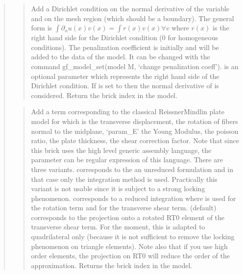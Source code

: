 \documentclass[a4paper,11pt,english]{sphinxmanual}
\begin{document}
\begin{quote}
\begin{quote}
\sphinxAtStartPar
Add a Dirichlet condition on the normal derivative of the variable
 and on the mesh region  (which should be a boundary).
The general form is
\(\int \partial_n u(x)v(x) = \int r(x)v(x) \forall v\)
where \(r(x)\) is
the right hand side for the Dirichlet condition (0 for
homogeneous conditions).
The penalization coefficient
is initially  and will be added to the data of the model.
It can be changed with the command gf\_model\_set(model M, ‘change penalization coeff’).
 is an optional parameter which represents
the right hand side of the Dirichlet condition.
If  is set to  then the normal
derivative of  is considered.
Return the brick index in the model.
\end{quote}

\sphinxAtStartPar
{}
\begin{quote}

\sphinxAtStartPar
Add a term corresponding to the classical Reissner\sphinxhyphen{}Mindlin plate
model for which  is the transverse displacement,
 the rotation of
fibers normal to the midplane, ‘param\_E’ the Young Modulus,
 the poisson ratio,
 the plate thickness,
 the shear correction factor. Note that since this brick
uses the high level generic assembly language, the parameter can
be regular expression of this language.
There are three variants.
 corresponds to the an
unreduced formulation and in that case only the integration
method  is used. Practically this variant is not usable since
it is subject to a strong locking phenomenon.
 corresponds to a reduced integration where  is
used for the rotation term and  for the transverse
shear term.  (default) corresponds to the projection onto
a rotated RT0 element of the transverse shear term. For the moment, this
is adapted to quadrilateral only (because it is not sufficient to
remove the locking phenomenon on triangle elements). Note also that if
you use high order elements, the projection on RT0 will reduce the order
of the approximation.
Returns the brick index in the model.
\end{quote}


\end{quote}
\end{document}
